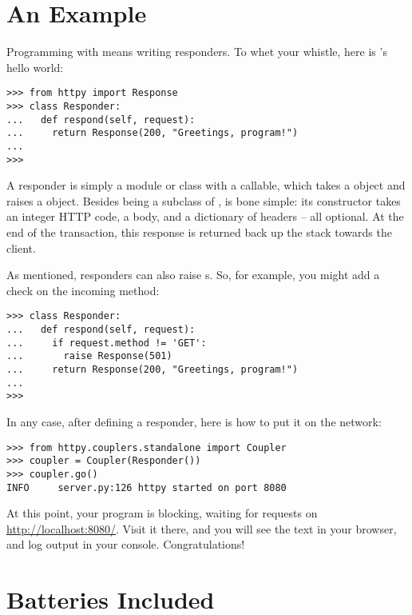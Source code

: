 \section{An Example \label{example}}

Programming with  means writing responders. To whet your whistle,
here is 's hello world:

\begin{verbatim}
>>> from httpy import Response
>>> class Responder:
...   def respond(self, request):
...     return Response(200, "Greetings, program!")
...
>>>
\end{verbatim}

A responder is simply a module or class with a  callable, which
takes a  object and raises a  object. Besides
being a subclass of ,  is bone simple: its
constructor takes an integer HTTP code, a body, and a dictionary of headers --
all optional. At the end of the transaction, this response is returned back up
the stack towards the client.

As mentioned, responders can also raise s. So, for example, you
might add a check on the incoming method:

\begin{verbatim}
>>> class Responder:
...   def respond(self, request):
...     if request.method != 'GET':
...       raise Response(501)
...     return Response(200, "Greetings, program!")
...
>>>
\end{verbatim}

In any case, after defining a responder, here is how to put it on the network:

\begin{verbatim}
>>> from httpy.couplers.standalone import Coupler
>>> coupler = Coupler(Responder())
>>> coupler.go()
INFO     server.py:126 httpy started on port 8080
\end{verbatim}

At this point, your program is blocking, waiting for requests on
\url{http://localhost:8080/}. Visit it there, and you will see the text
 in your browser, and log output in your console.
Congratulations!



\section{Batteries Included \label{batteries}}

